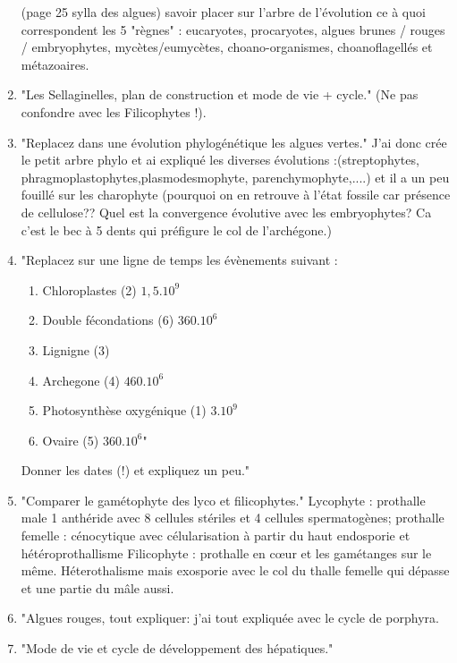 \begin{enumerate}
(page 25 sylla des algues) savoir placer sur l'arbre de l'évolution ce à quoi correspondent les 5 "règnes" : eucaryotes, procaryotes, algues brunes / rouges / embryophytes, mycètes/eumycètes, choano-organismes, choanoflagellés et métazoaires.

	\item "Les Sellaginelles, plan de construction et mode de vie + cycle." (Ne pas confondre avec les Filicophytes !).

	\item "Replacez dans une évolution phylogénétique les algues vertes." J'ai donc crée le petit arbre phylo et ai expliqué les diverses évolutions :(streptophytes, phragmoplastophytes,plasmodesmophyte, parenchymophyte,....) et il a un peu fouillé sur les charophyte (pourquoi on en retrouve à l'état fossile car présence de cellulose?? Quel est la convergence évolutive avec les embryophytes? Ca c'est le bec à 5 dents qui préfigure le col de l'archégone.)

	\item "Replacez sur une ligne de temps les évènements suivant :
\begin{enumerate}
	\item Chloroplastes (2) $1,5.10^9$
	\item Double fécondations (6) $360.10^6$
	\item Lignigne (3)
	\item Archegone (4) $460.10^6$
	\item Photosynthèse oxygénique (1) $3 .10^9$
	\item Ovaire (5) $360.10^6$"
\end{enumerate}

Donner les dates (!) et expliquez un peu."

	\item "Comparer le gamétophyte des lyco et filicophytes."
Lycophyte : prothalle male 1 anthéride avec 8 cellules stériles et 4 cellules spermatogènes; prothalle femelle : cénocytique avec célularisation à partir du haut endosporie et hétéroprothallisme
Filicophyte : prothalle en cœur et les gamétanges sur le même. Héterothalisme mais exosporie avec le col du thalle femelle qui dépasse et une partie du mâle aussi.

	\item "Algues rouges, tout expliquer: j’ai tout expliquée avec le cycle de porphyra.

	\item "Mode de vie et cycle de développement des hépatiques."


\end{enumerate}
